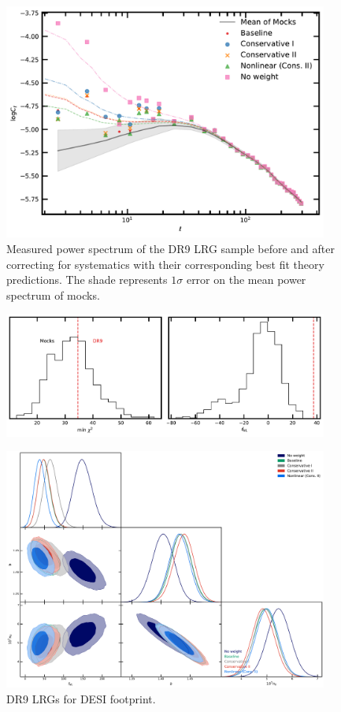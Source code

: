 \begin{figure}
    \centering
    \includegraphics[width=0.95\textwidth]{figures/model_dr9.pdf} 
    \caption{Measured power spectrum of the DR9 LRG sample before and after correcting for systematics with their corresponding best fit theory predictions. The shade represents $1\sigma$ error on the mean power spectrum of mocks.}
    \label{fig:cl_dr9}
\end{figure}

\begin{figure}
\centering
    \includegraphics[width=0.95\textwidth]{figures/pdf_dr9vsmocks.pdf} 
    \caption{}\label{fig:dr9vsmocks}
\end{figure}

\begin{figure}
    \centering
    \includegraphics[width=0.95\textwidth]{figures/mcmc_dr9methods.pdf} 
    \caption{DR9 LRGs for DESI footprint.}\label{fig:mcmc_dr9}
\end{figure}

